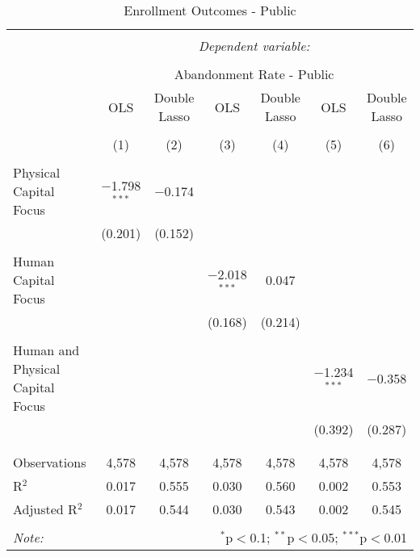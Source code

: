 
\begin{table}[!htbp] \centering 
  \caption{Enrollment Outcomes - Public} 
  \label{} 
\begin{tabular}{@{\extracolsep{5pt}}lcccccc} 
\\[-1.8ex]\hline 
\hline \\[-1.8ex] 
 & \multicolumn{6}{c}{\textit{Dependent variable:}} \\ 
\cline{2-7} 
\\[-1.8ex] & \multicolumn{6}{c}{Abandonment Rate - Public} \\ 
 & OLS & Double Lasso & OLS & Double Lasso & OLS & Double Lasso \\ 
\\[-1.8ex] & (1) & (2) & (3) & (4) & (5) & (6)\\ 
\hline \\[-1.8ex] 
 Physical Capital Focus & $-$1.798$^{***}$ & $-$0.174 &  &  &  &  \\ 
  & (0.201) & (0.152) &  &  &  &  \\ 
  & & & & & & \\ 
 Human Capital Focus &  &  & $-$2.018$^{***}$ & 0.047 &  &  \\ 
  &  &  & (0.168) & (0.214) &  &  \\ 
  & & & & & & \\ 
 Human and Physical Capital Focus &  &  &  &  & $-$1.234$^{***}$ & $-$0.358 \\ 
  &  &  &  &  & (0.392) & (0.287) \\ 
  & & & & & & \\ 
\hline \\[-1.8ex] 
Observations & 4,578 & 4,578 & 4,578 & 4,578 & 4,578 & 4,578 \\ 
R$^{2}$ & 0.017 & 0.555 & 0.030 & 0.560 & 0.002 & 0.553 \\ 
Adjusted R$^{2}$ & 0.017 & 0.544 & 0.030 & 0.543 & 0.002 & 0.545 \\ 
\hline 
\hline \\[-1.8ex] 
\textit{Note:}  & \multicolumn{6}{r}{$^{*}$p$<$0.1; $^{**}$p$<$0.05; $^{***}$p$<$0.01} \\ 
\end{tabular} 
\end{table} 
